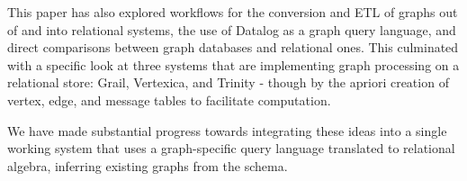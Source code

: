 \documentclass[11pt,letterpaper]{article}
\begin{document}
This paper has also explored workflows for the conversion and ETL of graphs out of and into relational systems, the use of Datalog as a graph query language, and direct comparisons between graph databases and relational ones. This culminated with a specific look at three systems that are implementing graph processing on a relational store: Grail, Vertexica, and Trinity - though by the apriori creation of vertex, edge, and message tables to facilitate computation.

We have made substantial progress towards integrating these ideas into a single working system that uses a graph-specific query language translated to relational algebra, inferring existing graphs from the schema.



\end{document}
